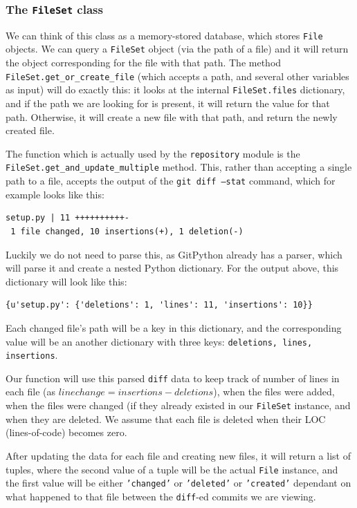\documentclass[12pt,twoside,notitlepage]{report}
\begin{document}
\subsubsection*{The \texttt{FileSet} class}
We can think of this class as a memory-stored database, which stores \texttt{File} objects. We can query a \texttt{FileSet} object (via the path of a file) and it will return the object corresponding for the file with that path. The method \texttt{FileSet.get\_or\_create\_file} (which accepts a path, and several other variables as input) will do exactly this: it looks at the internal \texttt{FileSet.files} dictionary, and if the path we are looking for is present, it will return the value for that path. Otherwise, it will create a new file with that path, and return the newly created file.

The function which is actually used by the \texttt{repository} module is the \texttt{FileSet.get\_and\_update\_multiple} method. This, rather than accepting a single path to a file, accepts the output of the \texttt{git diff --stat} command, which for example looks like this:
\begin{verbatim}
setup.py | 11 ++++++++++-
 1 file changed, 10 insertions(+), 1 deletion(-)
\end{verbatim}
Luckily we do not need to parse this, as GitPython already has a parser, which will parse it and create a nested Python dictionary. For the output above, this dictionary will look like this:
\begin{verbatim}
{u'setup.py': {'deletions': 1, 'lines': 11, 'insertions': 10}}
\end{verbatim}
Each changed file's path will be a key in this dictionary, and the corresponding value will be an another dictionary with three keys: \texttt{deletions, lines, insertions}. 

Our function will use this parsed \texttt{diff} data to keep track of number of lines in each file (as $linechange = insertions - deletions$), when the files were added, when the files were changed (if they already existed in our \texttt{FileSet} instance, and when they are deleted. We assume that each file is deleted when their LOC (lines-of-code) becomes zero.

After updating the data for each file and creating new files, it will return a list of tuples, where the second value of a tuple will be the actual \texttt{File} instance, and the first value will be either \texttt{'changed'} or \texttt{'deleted'} or \texttt{'created'} dependant on what happened to that file between the \texttt{diff}-ed commits we are viewing.
\end{document}
